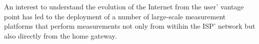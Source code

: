 An interest to understand the evolution of the Internet from the user' vantage
point has led to the deployment of a number of large-scale measurement
platforms that perform measurements not only from witihin the ISP' network but
also directly from the home gateway.


